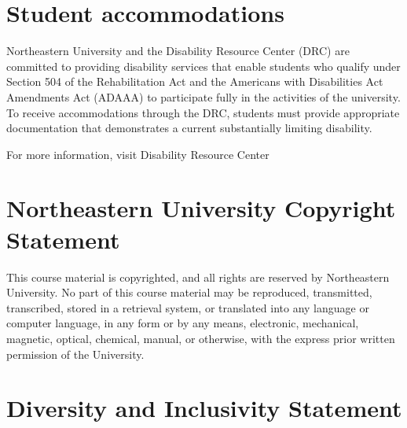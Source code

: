 \documentclass[letterpaper]{inzane_syllabus} %
\begin{document}
\vspace{0.1cm}
\section{ Student accommodations}
\vspace{0.05cm}

Northeastern University and the Disability Resource Center (DRC) are committed to providing disability services that enable students who qualify under Section 504 of the Rehabilitation Act and the Americans with Disabilities Act Amendments Act (ADAAA) to participate fully in the activities of the university.  To receive accommodations through the DRC, students must provide appropriate documentation that demonstrates a current substantially limiting disability. 
 
For more information, visit Disability Resource Center \href{http://www.northeastern.edu/drc/getting-started-with-the-drc/}{}

\vspace{0.1cm}
\section{Northeastern University Copyright Statement}
\vspace{0.05cm}

This course material is copyrighted, and all rights are reserved by Northeastern University. No part of this course material may be reproduced, transmitted, transcribed, stored in a retrieval system, or translated into any language or computer language, in any form or by any means, electronic, mechanical, magnetic, optical, chemical, manual, or otherwise, with the express prior written permission of the University.

\vspace{0.1cm}
\section{Diversity and Inclusivity Statement}
\vspace{0.05cm}
\end{document}
